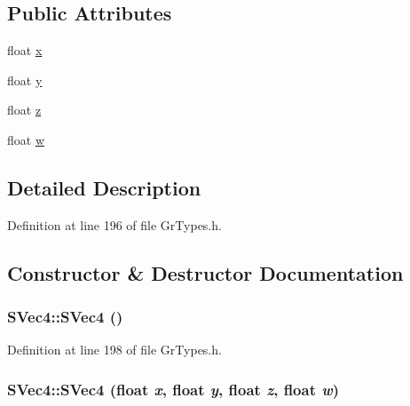 \subsection*{Public Attributes}
\begin{CompactItemize}
\item 
float \hyperlink{struct_s_vec4_b0b56171d97e8391eb5b139d7a97ca78}{x}
\item 
float \hyperlink{struct_s_vec4_14d72d33532154a5b90006e4bbe7d84a}{y}
\item 
float \hyperlink{struct_s_vec4_2391d03d7326ea13c075cf5e8de71c4f}{z}
\item 
float \hyperlink{struct_s_vec4_27c9c543518d87d4e7f0ace5487352d7}{w}
\end{CompactItemize}


\subsection{Detailed Description}


Definition at line 196 of file GrTypes.h.

\subsection{Constructor \& Destructor Documentation}
\hypertarget{struct_s_vec4_9b832ac71d33777098927b20ebaa9f19}{
\subsubsection[{SVec4}]{\setlength{\rightskip}{0pt plus 5cm}SVec4::SVec4 ()}}
\label{struct_s_vec4_9b832ac71d33777098927b20ebaa9f19}




Definition at line 198 of file GrTypes.h.\hypertarget{struct_s_vec4_1cddd253869141aba1d18c16ddfebddd}{
\subsubsection[{SVec4}]{\setlength{\rightskip}{0pt plus 5cm}SVec4::SVec4 (float {\em x}, \/  float {\em y}, \/  float {\em z}, \/  float {\em w})}}
\label{struct_s_vec4_1cddd253869141aba1d18c16ddfebddd}




